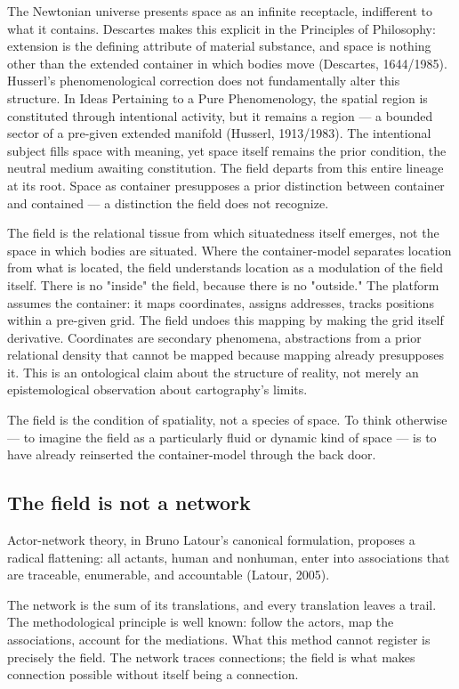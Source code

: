 The Newtonian universe presents space as an infinite receptacle, indifferent to what it contains. Descartes makes this explicit in the Principles of Philosophy: extension is the defining attribute of material substance, and space is nothing other than the extended container in which bodies move (Descartes, 1644/1985). Husserl's phenomenological correction does not fundamentally alter this structure. In Ideas Pertaining to a Pure Phenomenology, the spatial region is constituted through intentional activity, but it remains a region — a bounded sector of a pre-given extended manifold (Husserl, 1913/1983). The intentional subject fills space with meaning, yet space itself remains the prior condition, the neutral medium awaiting constitution. The field departs from this entire lineage at its root. Space as container presupposes a prior distinction between container and contained — a distinction the field does not recognize.

The field is the relational tissue from which situatedness itself emerges, not the space in which bodies are situated. Where the container-model separates location from what is located, the field understands location as a modulation of the field itself. There is no "inside" the field, because there is no "outside." The platform assumes the container: it maps coordinates, assigns addresses, tracks positions within a pre-given grid. The field undoes this mapping by making the grid itself derivative. Coordinates are secondary phenomena, abstractions from a prior relational density that cannot be mapped because mapping already presupposes it. This is an ontological claim about the structure of reality, not merely an epistemological observation about cartography's limits.

The field is the condition of spatiality, not a species of space. To think otherwise — to imagine the field as a particularly fluid or dynamic kind of space — is to have already reinserted the container-model through the back door.

\subsection{The field is not a network}

Actor-network theory, in Bruno Latour's canonical formulation, proposes a radical flattening: all actants, human and nonhuman, enter into associations that are traceable, enumerable, and accountable (Latour, 2005).

The network is the sum of its translations, and every translation leaves a trail. The methodological principle is well known: follow the actors, map the associations, account for the mediations. What this method cannot register is precisely the field. The network traces connections; the field is what makes connection possible without itself being a connection.

